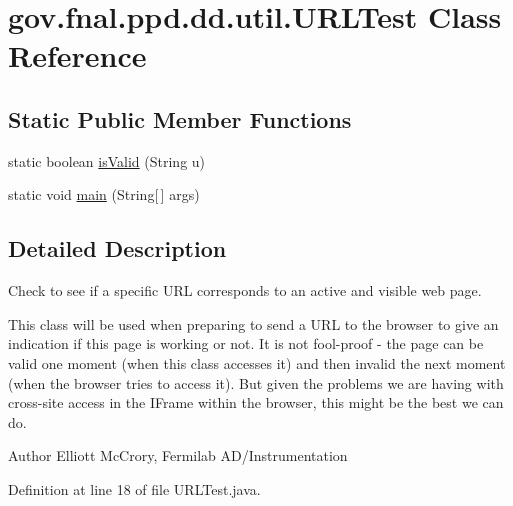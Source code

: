 \hypertarget{classgov_1_1fnal_1_1ppd_1_1dd_1_1util_1_1URLTest}{\section{gov.\-fnal.\-ppd.\-dd.\-util.\-U\-R\-L\-Test Class Reference}
\label{classgov_1_1fnal_1_1ppd_1_1dd_1_1util_1_1URLTest}
}
\subsection*{Static Public Member Functions}
\begin{DoxyCompactItemize}
\item 
static boolean \hyperlink{classgov_1_1fnal_1_1ppd_1_1dd_1_1util_1_1URLTest_a5980c2ae59d93447ff445eed97d29e63}{is\-Valid} (String u)
\item 
static void \hyperlink{classgov_1_1fnal_1_1ppd_1_1dd_1_1util_1_1URLTest_ab2b645bc0cff14b4fb57aa99b00ad9ac}{main} (String\mbox{[}$\,$\mbox{]} args)
\end{DoxyCompactItemize}


\subsection{Detailed Description}
Check to see if a specific U\-R\-L corresponds to an active and visible web page.

This class will be used when preparing to send a U\-R\-L to the browser to give an indication if this page is working or not. It is not fool-\/proof -\/ the page can be valid one moment (when this class accesses it) and then invalid the next moment (when the browser tries to access it). But given the problems we are having with cross-\/site access in the I\-Frame within the browser, this might be the best we can do.

\begin{DoxyAuthor}{Author}
Elliott Mc\-Crory, Fermilab A\-D/\-Instrumentation 
\end{DoxyAuthor}


Definition at line 18 of file U\-R\-L\-Test.\-java.



